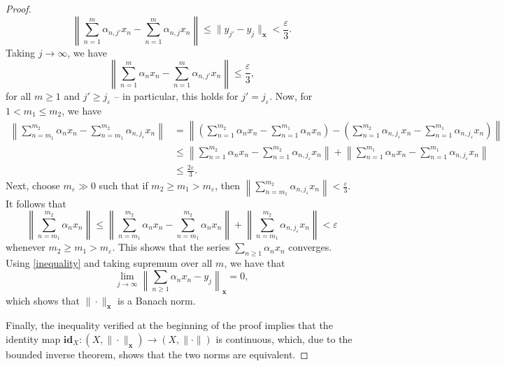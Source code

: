 \documentclass[11pt]{article}
\theoremstyle{thmstyle}
\theoremstyle{defstyle}
\newcommand{\id}{\mathbf{id}}
\renewcommand{\le}{\leqslant}
\renewcommand{\ge}{\geqslant}
\begin{document}
\begin{proof}
	\begin{equation*}
		\left\|\sum_{n = 1}^m \alpha_{n, j'}x_n - \sum_{n = 1}^m \alpha_{n, j}x_n\right\|\le \|y_{j'} - y_j\|_{\mathbf x} < \frac{\varepsilon}{3}.
	\end{equation*}
	Taking $j\to\infty$, we have 
	\begin{equation}\label{inequality}\tag{$\dagger$}
		\left\|\sum_{n = 1}^m\alpha_n x_n - \sum_{n = 1}^m \alpha_{n, j'}x_n\right\|\le\frac{\varepsilon}{3},
	\end{equation}
	for all $m\ge 1$ and $j'\ge j_{\varepsilon}$ -- in particular, this holds for $j' = j_{\varepsilon}$. Now, for $1 < m_1 \le m_2$, we have 
	\begin{align*}
		\left\|\sum_{n = m_1}^{m_2} \alpha_n x_n - \sum_{n = m_1}^{m_2}\alpha_{n, j_\varepsilon} x_n\right\| &= \left\|\left(\sum_{n = 1}^{m_2} \alpha_n x_n - \sum_{n = 1}^{m_1}\alpha_n x_n\right) - \left(\sum_{n = 1}^{m_2}\alpha_{n, j_\varepsilon} x_n - \sum_{n = 1}^{m_1}\alpha_{n, j_\varepsilon} x_n\right)\right\|\\
		&\le\left\|\sum_{n = 1}^{m_2}\alpha_n x_n - \sum_{n = 1}^{m_2}\alpha_{n, j_{\varepsilon}}x_n\right\| + \left\|\sum_{n = 1}^{m_1} \alpha_n x_n - \sum_{n = 1}^{m_1} \alpha_{n, j_{\varepsilon}}x_n\right\|\\
		&\le\frac{2\varepsilon}{3}.
	\end{align*}
	Next, choose $m_\varepsilon\gg 0$ such that if $m_2\ge m_1 > m_\varepsilon$, then $\displaystyle\left\|\sum_{n = m_1}^{m_2}\alpha_{n, j_\varepsilon}x_n\right\| < \frac{\varepsilon}{3}$. It follows that 
	\begin{equation*}
		\left\|\sum_{n = m_1}^{m_2} \alpha_nx_n\right\|\le\left\|\sum_{n = m_1}^{m_2}\alpha_nx_n - \sum_{n = m_1}^{m_2} \alpha_nx_n\right\| + \left\|\sum_{n = m_1}^{m_2} \alpha_{n, j_\varepsilon}x_n\right\| < \varepsilon
	\end{equation*}
	whenever $m_2\ge m_1 > m_\varepsilon$. This shows that the series $\displaystyle\sum_{n\ge 1}\alpha_n x_n$ converges. Using \eqref{inequality} and taking supremum over all $m$, we have that 
	\begin{equation*}
		\lim_{j\to\infty}\left\|\sum_{n\ge 1}\alpha_n x_n - y_j\right\|_{\mathbf x} = 0,
	\end{equation*}
	which shows that $\|\cdot\|_{\mathbf x}$ is a Banach norm.

	Finally, the inequality verified at the beginning of the proof implies that the identity map $\id_X\colon\left(X, \|\cdot\|_{\mathbf x}\right)\to\left(X, \|\cdot\|\right)$ is continuous, which, due to the bounded inverse theorem, shows that the two norms are equivalent.
\end{proof}
\end{document}
